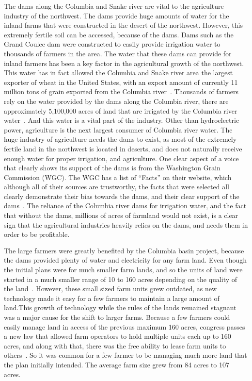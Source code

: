 \documentclass[12pt,twoside]{article}
\begin{document}
The dams along the Columbia and Snake river are vital to the agriculture industry of the northwest. The dams provide huge amounts of water for the inland farms that were constructed in the desert of the northwest. However, this extremely fertile soil can be accessed, because of the dams. Dams such as the Grand Coulee dam were constructed to easily provide irrigation water to thousands of farmers in the area. The water that these dams can provide for inland farmers has been a key factor in the agricultural growth of the northwest. This water has in fact allowed the Columbia and Snake river area the largest exporter of wheat in the United States, with an export amount of currently 11 million tons of grain exported from the Columbia river~\cite{USDA_GRAIN}. Thousands of farmers rely on the water provided by the dams along the Columbia river, there are approximately 5,100,000 acres of land that are irrigated by the Columbia river water~\cite{NWC_IRR}. And this water is a vital part of the industry. Other than hydroelectric power, agriculture is the next largest consumer of Columbia river water. The huge industry of agriculture needs the dams to exist, as most of the extremely fertile land in the northwest is located in deserts, and does not naturally receive enough water for proper irrigation, and agriculture. One clear aspect of a voice that clearly shows its support of the dams is from the Washington Grain Commission (WGC). The WGC has a list of ``Facts'' on their website, which although all of their sources are trustworthy, the facts that were selected all clearly demonstrate their bias towards the dams, and their clear support of the dams~\cite{WGC}. The reliance of the Columbia river dams for irrigation water, and the fact that without the dams, millions of acres of farmland would not exist, is a clear sign that the agricultural industries heavily relies on the dams, and needs them in order to be profitable.
\par
The large farmers were greatly benefited by the Columbia basin project, because the dams provided plenty of water and electricity for any farm land. Even though the initial plans were for much smaller farm lands, and so the units of land were started in a much smaller range of 10 to 160 acres depending on the quality of the land~\cite{PCP}. However, these small sized farm units grew outdated, as new technology made it easy for a few farmers to maintain a large amount of land.This growth of technology while the rules of the lands remained stagnant was a major cause for the shift to larger farms. Because a few farmers could easily manage land in access of the previous maximum 160 acres, congress passes a new law that allowed farm operators to hold multiple units each up to 160 acres, and along with that, there was the free ability to lease farm units to others~\cite{PCP}. So it was common for a few farmer to be managing much more land that the plan initially intended. The average farm size grew from 84 acres to 107 acres.
\end{document}
